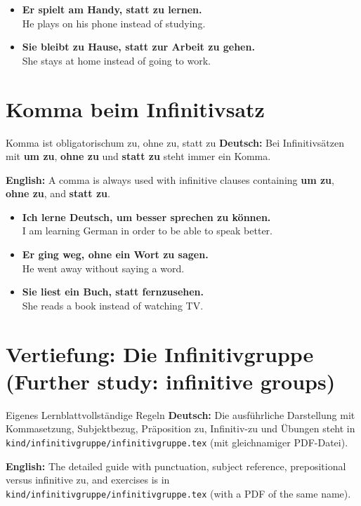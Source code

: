 \documentclass[a4paper,11pt]{article}
\newcommand{\GermanText}[1]{\textbf{Deutsch: }#1\par}
\newcommand{\EnglishText}[1]{{\small\color{SoftGray}\textbf{English: }#1\par}}
\newcommand{\ExampleItem}[2]{\item \textbf{#1}\\{\small\color{SoftGray}#2}}
\begin{document}
        \begin{exbox}
            \begin{itemize}
                \ExampleItem{Er spielt am Handy, statt zu lernen.}{He plays on his phone instead of studying.}
                \ExampleItem{Sie bleibt zu Hause, statt zur Arbeit zu gehen.}{She stays at home instead of going to work.}
            \end{itemize}
        \end{exbox}


    \section{Komma beim Infinitivsatz}

        \begin{grammarentry}{Komma ist obligatorisch}{um zu, ohne zu, statt zu}
            \GermanText{Bei Infinitivsätzen mit \textbf{um zu}, \textbf{ohne zu} und \textbf{statt zu} steht immer ein Komma.}
            \EnglishText{A comma is always used with infinitive clauses containing \textbf{um zu}, \textbf{ohne zu}, and \textbf{statt zu}.}
        \end{grammarentry}

        \begin{exbox}
            \begin{itemize}
                \ExampleItem{Ich lerne Deutsch, um besser sprechen zu können.}{I am learning German in order to be able to speak better.}
                \ExampleItem{Er ging weg, ohne ein Wort zu sagen.}{He went away without saying a word.}
                \ExampleItem{Sie liest ein Buch, statt fernzusehen.}{She reads a book instead of watching TV.}
            \end{itemize}
        \end{exbox}


    \section{Vertiefung: Die Infinitivgruppe \textnormal{(Further study: infinitive groups)}}

        \begin{grammarentry}{Eigenes Lernblatt}{vollständige Regeln}
            \GermanText{Die ausführliche Darstellung mit Kommasetzung, Subjektbezug, Präposition \glqq zu\grqq, Infinitiv-\glqq zu\grqq{} und Übungen steht in \texttt{kind/infinitivgruppe/infinitivgruppe.tex} (mit gleichnamiger PDF-Datei).}
            \EnglishText{The detailed guide with punctuation, subject reference, prepositional versus infinitive \glqq zu\grqq, and exercises is in \texttt{kind/infinitivgruppe/infinitivgruppe.tex} (with a PDF of the same name).}
        \end{grammarentry}
\end{document}
